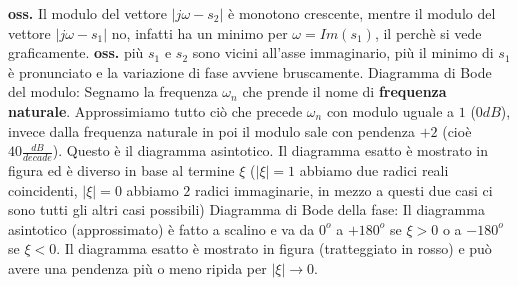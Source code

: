 \begin{itemize}
\begin{itemize}
        \newline
        \newline
        \textbf{oss.} Il modulo del vettore $|j \omega - s_2|$ è monotono crescente, mentre il modulo del vettore $|j \omega - s_1|$ no, infatti ha un minimo per $\omega = Im(s_1)$, il perchè si vede graficamente.\newline
        \newline
        \textbf{oss.} più $s_1$ e $s_2$ sono vicini all'asse immaginario, più il minimo di $s_1$ è pronunciato e la variazione di fase avviene bruscamente.\newline
        \newline
        \newline
        Diagramma di Bode del modulo: Segnamo la frequenza $\omega_n$ che prende il nome di \textbf{frequenza naturale}. Approssimiamo tutto ciò che precede $\omega_n$ con modulo uguale a $1$ ($0dB$), invece dalla frequenza naturale in poi il modulo sale con pendenza $+2$ (cioè $40 \frac{dB}{decade}$). Questo è il diagramma asintotico. Il diagramma esatto è mostrato in figura ed è diverso in base al termine $\xi$ ($|\xi| = 1$ abbiamo due radici reali coincidenti, $|\xi| = 0$ abbiamo $2$ radici immaginarie, in mezzo a questi due casi ci sono tutti gli altri casi possibili)\newline
        \newline
        \newline
        Diagramma di Bode della fase: Il diagramma asintotico (approssimato) è fatto a scalino e va da $0^o$ a $+ 180^o$ se $\xi > 0$ o a $-180^o$ se $\xi < 0$. Il diagramma esatto è mostrato in figura (tratteggiato in rosso) e può avere una pendenza più o meno ripida per $|\xi| \rightarrow 0$.
    \end{itemize} 
\end{itemize}
